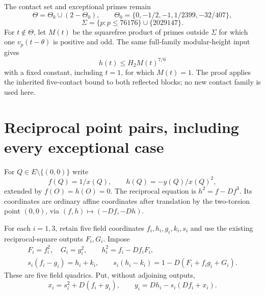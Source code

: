 \documentclass[11pt,a4paper]{article}
\begin{document}
The contact set and exceptional primes remain
\[
 \Theta=\Theta_0\cup(2-\Theta_0),\qquad
 \Theta_0=\{0,-1/2,-1,1/2399,-32/407\},
\]
\[
 \Sigma=\{p:p\le76176\}\cup\{2029147\}.
\]
For $t\notin\Theta$, let $M(t)$ be the squarefree product of primes
outside $\Sigma$ for which one $v_p(t-\theta)$ is positive and odd.
The same full-family modular-height input gives
\begin{equation}\label{eq:heightcontact}
                 h(t)\le H_2 M(t)^{7/6}
\end{equation}
with a fixed constant, including $t=1$, for which $M(t)=1$.
The proof applies the inherited five-contact bound to both reflected
blocks; no new contact family is used here.

\section{Reciprocal point pairs, including every exceptional case}
For $Q\in E\setminus\{(0,0)\}$ write
\[
 f(Q)=1/x(Q),\qquad h(Q)=-y(Q)/x(Q)^2,
\]
extended by $f(O)=h(O)=0$. The reciprocal equation is
$h^2=f-Df^3$. Its coordinates are ordinary affine coordinates after
translation by the two-torsion point $(0,0)$, via $(f,h)\mapsto(-Df,-Dh)$.

For each $i=1,3$, retain five field coordinates $f_i,h_i,g_i,k_i,s_i$
and use the existing reciprocal-square outputs $F_i,G_i$. Impose
\begin{equation}\label{eq:pair}
 \begin{split}
 F_i=f_i^2,\quad G_i=g_i^2,\qquad h_i^2=f_i-Df_iF_i,\\
 s_i(f_i-g_i)=h_i+k_i,\qquad
 s_i(h_i-k_i)=1-D(F_i+f_ig_i+G_i).
 \end{split}
\end{equation}
These are five field quadrics. Put, without adjoining outputs,
\begin{equation}\label{eq:diff}
 x_i=s_i^2+D(f_i+g_i),\qquad
 y_i=Dh_i-s_i(Df_i+x_i).
\end{equation}
\end{document}
